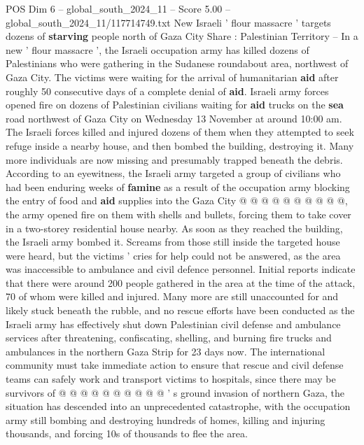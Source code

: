 \begin{textsample}{POS Dim 6 – global\_south\_2024\_11 – Score 5.00 – global\_south\_2024\_11/117714749.txt}  \label{ex:f6_pos_332}
New Israeli ' flour massacre ' targets dozens of \textbf{starving} people north of Gaza City Share : Palestinian Territory -- In a new ' flour massacre ', the Israeli occupation army has killed dozens of Palestinians who were gathering in the Sudanese roundabout area, northwest of Gaza City.
The victims were waiting for the arrival of humanitarian \textbf{aid} after roughly 50 consecutive days of a complete denial of \textbf{aid}.
Israeli army forces opened fire on dozens of Palestinian civilians waiting for \textbf{aid} trucks on the \textbf{sea} road northwest of Gaza City on Wednesday 13 November at around 10:00 am.
The Israeli forces killed and injured dozens of them when they attempted to seek refuge inside a nearby house, and then bombed the building, destroying it.
Many more individuals are now missing and presumably trapped beneath the debris.
According to an eyewitness, the Israeli army targeted a group of civilians who had been enduring weeks of \textbf{famine} as a result of the occupation army blocking the entry of food and \textbf{aid} supplies into the Gaza City @ @ @ @ @ @ @ @ @ @, the army opened fire on them with shells and bullets, forcing them to take cover in a two-storey residential house nearby.
As soon as they reached the building, the Israeli army bombed it.
Screams from those still inside the targeted house were heard, but the victims ' cries for help could not be answered, as the area was inaccessible to ambulance and civil defence personnel.
Initial reports indicate that there were around 200 people gathered in the area at the time of the attack, 70 of whom were killed and injured.
Many more are still unaccounted for and likely stuck beneath the rubble, and no rescue efforts have been conducted as the Israeli army has effectively shut down Palestinian civil defense and ambulance services after threatening, confiscating, shelling, and burning fire trucks and ambulances in the northern Gaza Strip for 23 days now.
The international community must take immediate action to ensure that rescue and civil defense teams can safely work and transport victims to hospitals, since there may be survivors of @ @ @ @ @ @ @ @ @ @ ' s ground invasion of northern Gaza, the situation has descended into an unprecedented catastrophe, with the occupation army still bombing and destroying hundreds of homes, killing and injuring thousands, and forcing 10s of thousands to flee the area.

\end{textsample}
